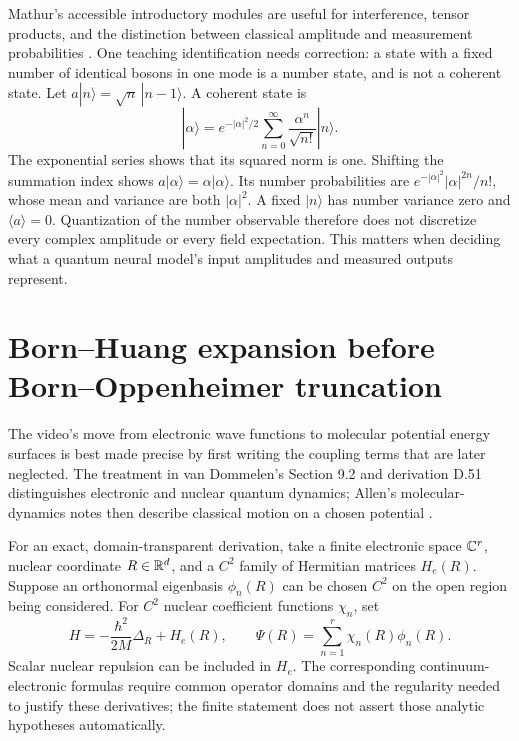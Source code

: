 Mathur's accessible introductory modules are useful for interference,
tensor products, and the distinction between classical amplitude and
measurement probabilities \citep{microMathur}.  One teaching
identification needs correction: a state with a fixed number of identical
bosons in one mode is a number state, and is not a coherent state.
Let $a|n\rangle=\sqrt n\,|n-1\rangle$.  A coherent state is
\begin{equation}
 |\alpha\rangle=e^{-|\alpha|^2/2}
       \sum_{n=0}^{\infty}\frac{\alpha^n}{\sqrt{n!}}|n\rangle.
 \label{eq:micro-coherent}
\end{equation}
The exponential series shows that its squared norm is one.  Shifting
the summation index shows $a|\alpha\rangle=\alpha|\alpha\rangle$.
Its number probabilities are
$e^{-|\alpha|^2}|\alpha|^{2n}/n!$, whose mean and variance are both
$|\alpha|^2$.  A fixed $|n\rangle$ has number variance zero and
$\langle a\rangle=0$.  Quantization of the number observable therefore
does not discretize every complex amplitude or every field expectation.
This matters when deciding what a quantum neural model's input amplitudes
and measured outputs represent.

\section{Born--Huang expansion before Born--Oppenheimer truncation}

The video's move from electronic wave functions to molecular potential
energy surfaces is best made precise by first writing the coupling terms
that are later neglected.  The treatment in van Dommelen's Section 9.2
and derivation D.51 distinguishes electronic and nuclear quantum dynamics;
Allen's molecular-dynamics notes then describe classical motion on a chosen
potential \citep{microVanDommelen,microAllen2004}.

For an exact, domain-transparent derivation, take a finite electronic
space $\mathbb{C}^r$, nuclear coordinate $R\in\mathbb{R}^d$, and a $C^2$ family of
Hermitian matrices $H_e(R)$.  Suppose an orthonormal eigenbasis
$\phi_n(R)$ can be chosen $C^2$ on the open region being considered.
For $C^2$ nuclear coefficient functions $\chi_n$, set
\[
 H=-\frac{\hbar^2}{2M}\Delta_R+H_e(R),\qquad
 \Psi(R)=\sum_{n=1}^r\chi_n(R)\phi_n(R).
\]
Scalar nuclear repulsion can be included in $H_e$.  The corresponding
continuum-electronic formulas require common operator domains and the
regularity needed to justify these derivatives; the finite statement
does not assert those analytic hypotheses automatically.

